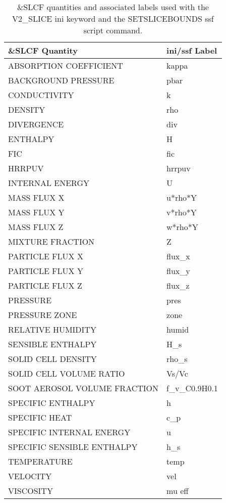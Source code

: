 \begin{table}[bph]
\begin{center}
\caption{\&SLCF quantities and associated labels used with the V2\_SLICE ini keyword and the SETSLICEBOUNDS ssf script command.}
\vspace{0.1in}
\begin{tabular}{|l|l|}
\hline
\&SLCF Quantity & ini/ssf Label \\ \hline
 ABSORPTION COEFFICIENT  &   kappa \\ \hline
 BACKGROUND PRESSURE  &   pbar \\ \hline
 CONDUCTIVITY  &   k \\ \hline
 DENSITY  &   rho \\ \hline
 DIVERGENCE  &   div \\ \hline
 ENTHALPY  &   H \\ \hline
 FIC  &   fic \\ \hline
 HRRPUV  &   hrrpuv \\ \hline
 INTERNAL ENERGY  &   U \\ \hline
 MASS FLUX X  &   u*rho*Y \\ \hline
 MASS FLUX Y  &   v*rho*Y \\ \hline
 MASS FLUX Z  &   w*rho*Y \\ \hline
 MIXTURE FRACTION  &   Z \\ \hline
 PARTICLE FLUX X  &   flux\_x \\ \hline
 PARTICLE FLUX Y  &   flux\_y \\ \hline
 PARTICLE FLUX Z  &   flux\_z \\ \hline
 PRESSURE  &   pres \\ \hline
 PRESSURE ZONE  &   zone \\ \hline
 RELATIVE HUMIDITY  &   humid \\ \hline
 SENSIBLE ENTHALPY  &   H\_s \\ \hline
 SOLID CELL DENSITY  &   rho\_s \\ \hline
 SOLID CELL VOLUME RATIO  &   Vs/Vc \\ \hline
 SOOT AEROSOL VOLUME FRACTION  &   f\_v\_C0.9H0.1 \\ \hline
 SPECIFIC ENTHALPY  &   h \\ \hline
 SPECIFIC HEAT  &   c\_p \\ \hline
 SPECIFIC INTERNAL ENERGY  &   u \\ \hline
 SPECIFIC SENSIBLE ENTHALPY  &   h\_s \\ \hline
 TEMPERATURE  &   temp \\ \hline
 VELOCITY  &   vel \\ \hline
 VISCOSITY  &   mu eff \\ \hline
\end{tabular}
\label{tabSLCF}
\end{center}
\end{table}
